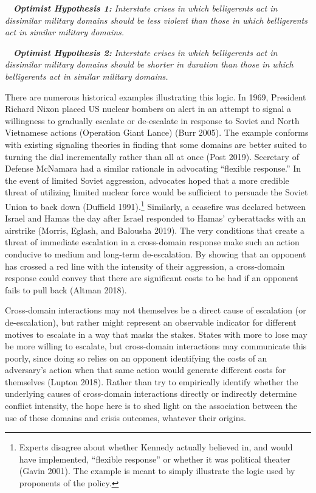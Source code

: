 \documentclass[
]{article}
\begin{document}
~~\textbf{\textit{Optimist Hypothesis 1:}}\textit{ Interstate crises in which belligerents act in dissimilar military domains should be less violent than those in which belligerents act in similar military domains.}

~~\textbf{\textit{Optimist Hypothesis 2:}}\textit{ Interstate crises in which belligerents act in dissimilar military domains should be shorter in duration than those in which belligerents act in similar military domains.}

There are numerous historical examples illustrating this logic. In 1969, President Richard Nixon placed US nuclear bombers on alert in an attempt to signal a willingness to gradually escalate or de-escalate in response to Soviet and North Vietnamese actions (Operation Giant Lance) (Burr 2005). The example conforms with existing signaling theories in finding that some domains are better suited to turning the dial incrementally rather than all at once (Post 2019). Secretary of Defense McNamara had a similar rationale in advocating ``flexible response.'' In the event of limited Soviet aggression, advocates hoped that a more credible threat of utilizing limited nuclear force would be sufficient to persuade the Soviet Union to back down (Duffield 1991).\footnote{Experts disagree about whether Kennedy actually believed in, and would have implemented, ``flexible response'' or whether it was political theater (Gavin 2001). The example is meant to simply illustrate the logic used by proponents of the policy.} Similarly, a ceasefire was declared between Israel and Hamas the day after Israel responded to Hamas' cyberattacks with an airstrike (Morris, Eglash, and Balousha 2019). The very conditions that create a threat of immediate escalation in a cross-domain response make such an action conducive to medium and long-term de-escalation. By showing that an opponent has crossed a red line with the intensity of their aggression, a cross-domain response could convey that there are significant costs to be had if an opponent fails to pull back (Altman 2018).

Cross-domain interactions may not themselves be a direct cause of escalation (or de-escalation), but rather might represent an observable indicator for different motives to escalate in a way that masks the stakes. States with more to lose may be more willing to escalate, but cross-domain interactions may communicate this poorly, since doing so relies on an opponent identifying the costs of an adversary's action when that same action would generate different costs for themselves (Lupton 2018). Rather than try to empirically identify whether the underlying causes of cross-domain interactions directly or indirectly determine conflict intensity, the hope here is to shed light on the association between the use of these domains and crisis outcomes, whatever their origins.
\end{document}
